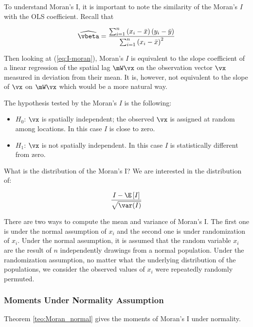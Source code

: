 \documentclass[english,12pt]{book}\usepackage[]{graphicx}\usepackage[]{xcolor}
\begin{document}
To understand Moran's I, it is important to note the similarity of the Moran's $I$ with the OLS coefficient. Recall that 

\begin{equation}
  \widehat{\vbeta}= \frac{\sum_{i = 1}^n\left(x_i - \bar{x}\right)(y_i - \bar{y})}{\sum_{i = 1}^n \left(x_i - \bar{x}\right)^2}
\end{equation}

Then looking at (\ref{eq:I-moran}), Moran's $I$ is equivalent to the slope coefficient of a linear regression of the spatial lag $\mW\vx$ on the observation vector $\vx$ measured in deviation from their mean. It is, however, not equivalent to the slope of $\vx$ on $\mW\vx$ which would be a more natural way. 

The hypothesis tested by the Moran's $I$ is the following:

\begin{itemize}
  \item $H_0$: $\vx$ is spatially independent; the observed $\vx$ is assigned at random among locations. In this case $I$ is close to zero.
  \item $H_1$: $\vx$ is not spatially independent. In this case $I$ is statistically different from zero. 
\end{itemize}

What is the distribution of the Moran's I? We are interested in the distribution of:

\begin{equation*}
  \frac{I - \E\left[I\right]}{\sqrt{\var(I)}}
\end{equation*}

There are two ways to compute the mean and variance of Moran's I. The first one is under the normal assumption of $x_i$ and the second one is under randomization of $x_i$. Under the normal assumption, it is assumed that the random variable $x_i$ are the result of $n$ independently drawings from a normal population. Under the randomization assumption, no matter what the underlying distribution of the populations, we consider the observed values of $x_i$ were repeatedly randomly permuted.

\subsubsection{Moments Under Normality Assumption}

Theorem \ref{teo:Moran_normal} gives the moments of Moran's I under normality. 
\end{document}
